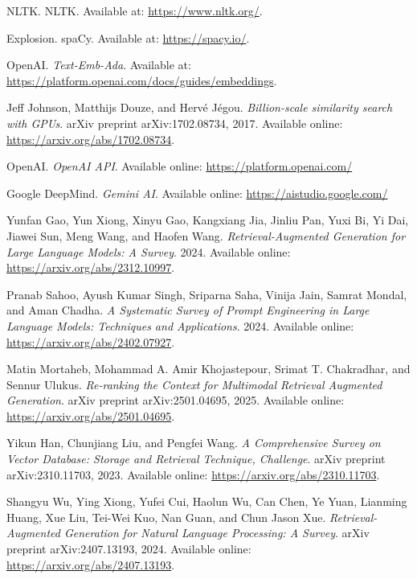 \documentclass{article}
\begin{document}
\begin{thebibliography}{99}
NLTK. 
NLTK. 
Available at: \url{https://www.nltk.org/}.

Explosion. 
spaCy. 
Available at: \url{https://spacy.io/}.

OpenAI.
\textit{Text-Emb-Ada}. 
Available at: \url{https://platform.openai.com/docs/guides/embeddings}.

Jeff Johnson, Matthijs Douze, and Hervé Jégou. 
\textit{Billion-scale similarity search with GPUs}. 
arXiv preprint arXiv:1702.08734, 2017. 
Available online: \url{https://arxiv.org/abs/1702.08734}.

OpenAI. 
\textit{OpenAI API}. 
Available online: \url{https://platform.openai.com/}

Google DeepMind. 
\textit{Gemini AI}. 
Available online: \url{https://aistudio.google.com/}

Yunfan Gao, Yun Xiong, Xinyu Gao, Kangxiang Jia, Jinliu Pan, Yuxi Bi, Yi Dai, Jiawei Sun, Meng Wang, and Haofen Wang. 
\textit{Retrieval-Augmented Generation for Large Language Models: A Survey}. 
2024. Available online: \url{https://arxiv.org/abs/2312.10997}.

Pranab Sahoo, Ayush Kumar Singh, Sriparna Saha, Vinija Jain, Samrat Mondal, and Aman Chadha. 
\textit{A Systematic Survey of Prompt Engineering in Large Language Models: Techniques and Applications}. 
2024. Available online: \url{https://arxiv.org/abs/2402.07927}.

Matin Mortaheb, Mohammad A. Amir Khojastepour, Srimat T. Chakradhar, and Sennur Ulukus. 
\textit{Re-ranking the Context for Multimodal Retrieval Augmented Generation}. 
arXiv preprint arXiv:2501.04695, 2025. 
Available online: \url{https://arxiv.org/abs/2501.04695}.

Yikun Han, Chunjiang Liu, and Pengfei Wang. 
\textit{A Comprehensive Survey on Vector Database: Storage and Retrieval Technique, Challenge}. 
arXiv preprint arXiv:2310.11703, 2023. 
Available online: \url{https://arxiv.org/abs/2310.11703}.

Shangyu Wu, Ying Xiong, Yufei Cui, Haolun Wu, Can Chen, Ye Yuan, Lianming Huang, Xue Liu, Tei-Wei Kuo, Nan Guan, and Chun Jason Xue. 
\textit{Retrieval-Augmented Generation for Natural Language Processing: A Survey}. 
arXiv preprint arXiv:2407.13193, 2024. 
Available online: \url{https://arxiv.org/abs/2407.13193}.

\end{thebibliography}
\end{document}
